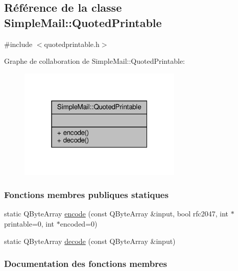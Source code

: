 \hypertarget{class_simple_mail_1_1_quoted_printable}{}\subsection{Référence de la classe Simple\+Mail\+:\+:Quoted\+Printable}
\label{class_simple_mail_1_1_quoted_printable}


{\ttfamily \#include $<$quotedprintable.\+h$>$}



Graphe de collaboration de Simple\+Mail\+:\+:Quoted\+Printable\+:\nopagebreak
\begin{figure}[H]
\begin{center}
\leavevmode
\includegraphics[width=220pt]{class_simple_mail_1_1_quoted_printable__coll__graph}
\end{center}
\end{figure}
\subsubsection*{Fonctions membres publiques statiques}
\begin{DoxyCompactItemize}
\item 
static Q\+Byte\+Array \hyperlink{class_simple_mail_1_1_quoted_printable_a8426b74cafe1c93232ac60d3f077c9e8}{encode} (const Q\+Byte\+Array \&input, bool rfc2047, int $\ast$printable=0, int $\ast$encoded=0)
\item 
static Q\+Byte\+Array \hyperlink{class_simple_mail_1_1_quoted_printable_a0d2348902e414c30afbcd970e9270eea}{decode} (const Q\+Byte\+Array \&input)
\end{DoxyCompactItemize}


\subsubsection{Documentation des fonctions membres}
\mbox{\label{class_simple_mail_1_1_quoted_printable_a0d2348902e414c30afbcd970e9270eea}} 
